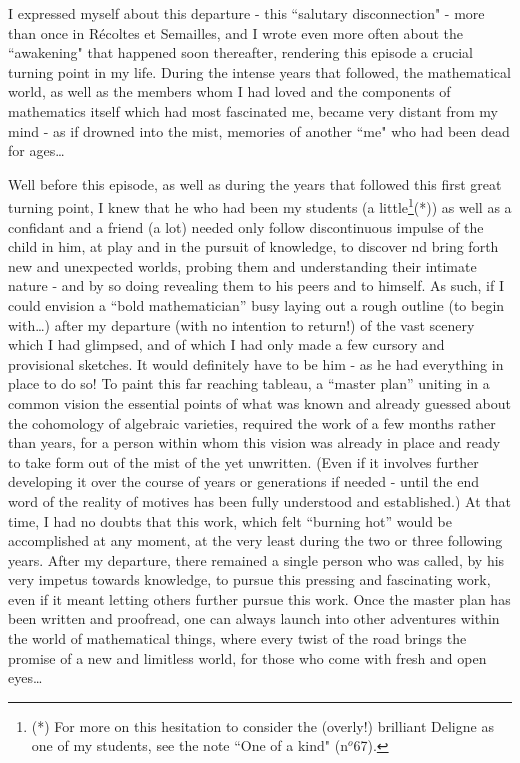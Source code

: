 I expressed myself about this departure - this ``salutary disconnection" - more than once
in R\'ecoltes et Semailles, and I wrote even more often about the ``awakening" that
happened soon thereafter, rendering this episode a crucial turning point in my life.
During the intense years that followed, the mathematical world, as well as the members
whom I had loved and the components of mathematics itself which had most fascinated me,
became very distant from my mind - as if drowned into the mist, memories of another ``me"
who had been dead for ages\ldots

Well before this episode, as well as during the years that followed this first 
great turning point, I knew that he who had been my students (a little\footnote{(*) For more on this hesitation to consider the (overly!) brilliant Deligne as one of my students, see the note ``One of a kind" (n$^o$67).}(*))
as well as a confidant and a friend (a lot) needed only follow discontinuous 
impulse of the child in him, at play and in the pursuit of knowledge, to discover nd bring
forth new and unexpected worlds, probing them and understanding their intimate nature - 
and by so doing revealing them to his peers and to himself. 
As such, if I could envision a ``bold mathematician'' busy laying out a rough outline (to begin
with\ldots) after my departure (with no intention to return!) of the vast scenery 
which I had glimpsed, and of which I had only made a few cursory and provisional sketches.
It would definitely have to be him - 
as he had everything in place to do so!
To paint this far reaching tableau, a ``master plan'' uniting in a common vision the
essential points of what was known and already guessed about the cohomology
of algebraic varieties, required the work of a few months rather than years,
for a person within whom this vision was already in place and ready to take form out of
the mist of the yet unwritten.
(Even if it involves further developing it over the course of years or generations if
needed - until the end word of the reality of motives has been fully understood and
established.)
At that time, I had no doubts that this work, which felt ``burning hot'' would be
accomplished at any moment, at the very least during the two or three following years.
After my departure, there remained a single person who was called, by his very impetus
towards knowledge, to pursue this pressing and fascinating work,
even if it meant letting others further pursue this work.
Once the master plan has been
written and proofread, one can always launch into other adventures within the world of
mathematical things, where every twist of the road brings the promise of a new and
limitless world, for those who come with fresh and open eyes\ldots


